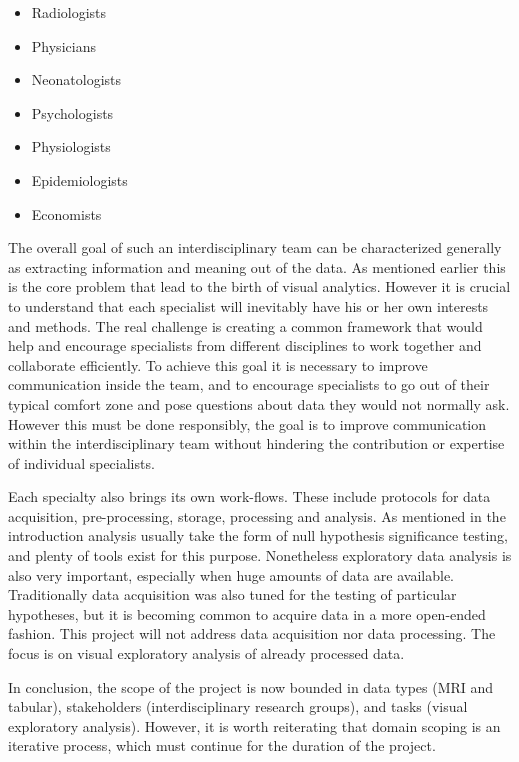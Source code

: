 \begin{itemize}
\item Radiologists
\item Physicians
\item Neonatologists
\item Psychologists
\item Physiologists
\item Epidemiologists
\item Economists
\end{itemize}

The overall goal of such an interdisciplinary team can be characterized generally as  extracting information and meaning out of the data. As mentioned earlier this is the core problem that lead to the birth of visual analytics. However it is crucial to understand that each specialist will inevitably have his or her  own interests and methods. The real challenge is creating a common framework that would help and encourage specialists from different disciplines to work together and collaborate efficiently. To achieve this goal it is necessary to improve communication inside the team, and to encourage specialists to go out of their typical comfort zone and pose questions about data they would not normally ask. However this must be done responsibly, the goal is to improve communication within the interdisciplinary team without hindering the contribution or expertise of individual specialists.

Each specialty also brings its own work-flows. These include protocols for data acquisition, pre-processing, storage, processing and analysis. As mentioned in the introduction analysis usually take the form of null hypothesis significance testing, and plenty of tools exist for this purpose. Nonetheless exploratory data analysis is also very important, especially when huge amounts of data are available. Traditionally data acquisition was also tuned for the testing of particular hypotheses, but it is becoming common to acquire data in a more open-ended fashion. This project will not address data acquisition nor data processing. The focus is on visual exploratory analysis of already processed data.  

In conclusion, the scope of the project is now bounded in data types (MRI and tabular), stakeholders (interdisciplinary research groups), and tasks (visual exploratory analysis). However, it is worth reiterating that domain scoping is an iterative process, which must continue for the duration of the project. 


